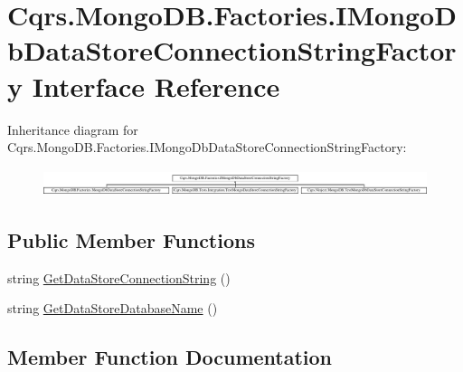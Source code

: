 \hypertarget{interfaceCqrs_1_1MongoDB_1_1Factories_1_1IMongoDbDataStoreConnectionStringFactory}{}\section{Cqrs.\+Mongo\+D\+B.\+Factories.\+I\+Mongo\+Db\+Data\+Store\+Connection\+String\+Factory Interface Reference}
\label{interfaceCqrs_1_1MongoDB_1_1Factories_1_1IMongoDbDataStoreConnectionStringFactory}
Inheritance diagram for Cqrs.\+Mongo\+D\+B.\+Factories.\+I\+Mongo\+Db\+Data\+Store\+Connection\+String\+Factory\+:\begin{figure}[H]
\begin{center}
\leavevmode
\includegraphics[height=0.802867cm]{interfaceCqrs_1_1MongoDB_1_1Factories_1_1IMongoDbDataStoreConnectionStringFactory}
\end{center}
\end{figure}
\subsection*{Public Member Functions}
\begin{DoxyCompactItemize}
\item 
string \hyperlink{interfaceCqrs_1_1MongoDB_1_1Factories_1_1IMongoDbDataStoreConnectionStringFactory_a31cb87fb2cf1435912f635394494ed91_a31cb87fb2cf1435912f635394494ed91}{Get\+Data\+Store\+Connection\+String} ()
\item 
string \hyperlink{interfaceCqrs_1_1MongoDB_1_1Factories_1_1IMongoDbDataStoreConnectionStringFactory_aca9921fae4214a9eb22a221825c57363_aca9921fae4214a9eb22a221825c57363}{Get\+Data\+Store\+Database\+Name} ()
\end{DoxyCompactItemize}


\subsection{Member Function Documentation}
\mbox{\label{interfaceCqrs_1_1MongoDB_1_1Factories_1_1IMongoDbDataStoreConnectionStringFactory_a31cb87fb2cf1435912f635394494ed91_a31cb87fb2cf1435912f635394494ed91}} 

